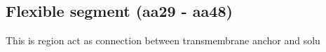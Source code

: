 \subsection{Flexible segment (aa29 - aa48)}

This is region act as connection between transmembrane anchor and solu
